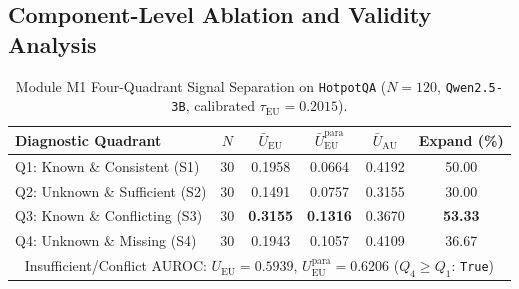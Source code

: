 \documentclass[11pt]{article}
\begin{document}
\subsection{Component-Level Ablation and Validity Analysis}

\begin{table}[t]
\centering
\small
\setlength{\tabcolsep}{16pt}
\caption{Module M1 Four-Quadrant Signal Separation on \texttt{HotpotQA} ($N=120$, \texttt{Qwen2.5-3B}, calibrated $\tau_{\text{EU}} = 0.2015$).}
\label{tab:wp8_m1}
\begin{tabular}{lccccc}
\toprule
\textbf{Diagnostic Quadrant} & $N$ & $\bar{U}_{\text{EU}}$ & $\bar{U}_{\text{EU}}^{\text{para}}$ & $\bar{U}_{\text{AU}}$ & \textbf{Expand (\%)} \\
\midrule
Q1: Known \& Consistent (S1) & 30 & 0.1958 & 0.0664 & 0.4192 & 50.00 \\
Q2: Unknown \& Sufficient (S2) & 30 & 0.1491 & 0.0757 & 0.3155 & 30.00 \\
Q3: Known \& Conflicting (S3) & 30 & \textbf{0.3155} & \textbf{0.1316} & 0.3670 & \textbf{53.33} \\
Q4: Unknown \& Missing (S4) & 30 & 0.1943 & 0.1057 & 0.4109 & 36.67 \\
\midrule
\multicolumn{6}{c}{Insufficient/Conflict AUROC: $U_{\text{EU}} = 0.5939$, $U_{\text{EU}}^{\text{para}} = \mathbf{0.6206}$ ($Q_4 \ge Q_1$: \texttt{True})} \\
\bottomrule
\end{tabular}
\end{table}
\end{document}
